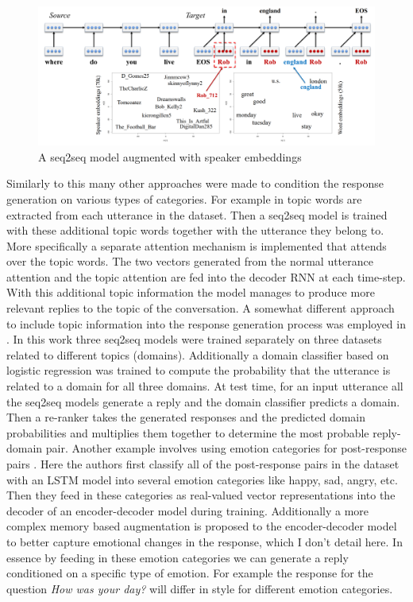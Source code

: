 \documentclass[12pt]{article}
\begin{document}
\begin{figure}[H]
	\centering
	\includegraphics[width=1.0\textwidth]{pics/persona.png}
	\caption{A seq2seq model augmented with speaker embeddings \cite{Li:2016}}
	\label{fig:persona}
\end{figure}

Similarly to this many other approaches were made to condition the response generation on various types of categories. For example in \cite{Xing_topic:2017} topic words are extracted from each utterance in the dataset. Then a seq2seq model is trained with these additional topic words together with the utterance they belong to. More specifically a separate attention mechanism is implemented that attends over the topic words. The two vectors generated from the normal utterance attention and the topic attention are fed into the decoder RNN at each time-step. With this additional topic information the model manages to produce more relevant replies to the topic of the conversation. A somewhat different approach to include topic information into the response generation process was employed in \cite{Choudhary:2017}. In this work three seq2seq models were trained separately on three datasets related to different topics (domains). Additionally a domain classifier based on logistic regression was trained to compute the probability that the utterance is related to a domain for all three domains. At test time, for an input utterance all the seq2seq models generate a reply and the domain classifier predicts a domain. Then a re-ranker takes the generated responses and the predicted domain probabilities and multiplies them together to determine the most probable reply-domain pair. Another example involves using emotion categories for post-response pairs \cite{Zhou:2017}. Here the authors first classify all of the post-response pairs in the dataset with an LSTM model into several emotion categories like happy, sad, angry, etc. Then they feed in these categories as real-valued vector representations into the decoder of an encoder-decoder model during training. Additionally a more complex memory based augmentation is proposed to the encoder-decoder model to better capture emotional changes in the response, which I don't detail here. In essence by feeding in these emotion categories we can generate a reply conditioned on a specific type of emotion. For example the response for the question \textit{How was your day?} will differ in style for different emotion categories.
\end{document}
